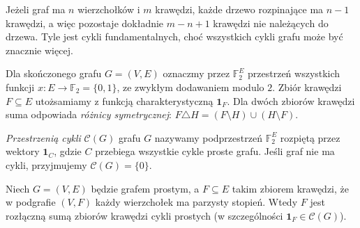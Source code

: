 Jeżeli graf ma $n$ wierzchołków i $m$ krawędzi,
każde drzewo rozpinające ma $n-1$ krawędzi,
a więc pozostaje dokładnie $m-n+1$ krawędzi
nie należących do drzewa. Tyle jest cykli
fundamentalnych, choć wszystkich cykli grafu
może być znacznie więcej.

\begin{center}
\end{center}

\begin{definicja}
Dla skończonego grafu $G=(V,E)$ oznaczmy
przez $\mathbb F_2^E$ przestrzeń wszystkich
funkcji $x:E\to\mathbb F_2=\{0,1\}$, ze
zwykłym dodawaniem modulo $2$.
Zbiór krawędzi $F\subseteq E$ utożsamiamy
z funkcją charakterystyczną $\mathbf1_F$.
Dla dwóch zbiorów krawędzi suma odpowiada
\emph{różnicy symetrycznej}:
$F\triangle H=(F\setminus H)\cup(H\setminus F)$.
\end{definicja}

\begin{definicja}
\emph{Przestrzenią cykli} $\mathcal C(G)$ grafu
$G$ nazywamy podprzestrzeń $\mathbb F_2^E$
rozpiętą przez wektory $\mathbf1_C$,
gdzie $C$ przebiega wszystkie cykle proste grafu.
Jeśli graf nie ma cykli, przyjmujemy
$\mathcal C(G)=\{0\}$.
\end{definicja}

\begin{lemat}
Niech $G=(V,E)$ będzie grafem prostym,
a $F\subseteq E$ takim zbiorem krawędzi,
że w podgrafie $(V,F)$ każdy wierzchołek ma
parzysty stopień. Wtedy $F$ jest rozłączną
sumą zbiorów krawędzi cykli prostych
(w szczególności $\mathbf1_F\in\mathcal C(G)$).
\end{lemat}

